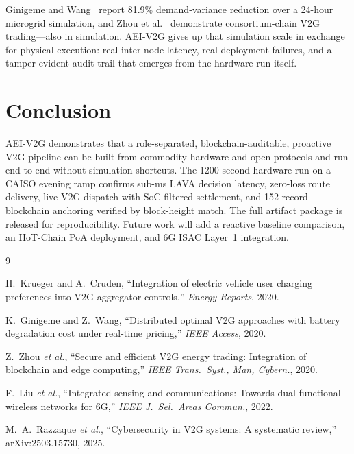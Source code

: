 \documentclass[journal,twoside,twocolumn]{IEEEtran}
\begin{document}
Ginigeme and Wang~\cite{ginigeme2020distributed} report 81.9\% demand-variance
reduction over a 24-hour microgrid simulation, and Zhou et al.~\cite{zhou2020v2g}
demonstrate consortium-chain V2G trading---also in simulation. AEI-V2G gives up
that simulation scale in exchange for physical execution: real inter-node
latency, real deployment failures, and a tamper-evident audit trail that emerges
from the hardware run itself.

\section{Conclusion}
\label{sec:conclude}

AEI-V2G demonstrates that a role-separated, blockchain-auditable, proactive V2G
pipeline can be built from commodity hardware and open protocols and run
end-to-end without simulation shortcuts. The 1200-second hardware run on a CAISO
evening ramp confirms sub-ms LAVA decision latency, zero-loss route delivery,
live V2G dispatch with SoC-filtered settlement, and 152-record blockchain
anchoring verified by block-height match. The full artifact package is released
for reproducibility. Future work will add a reactive baseline comparison, an
IIoT-Chain PoA deployment, and 6G ISAC Layer~1 integration.

\begin{thebibliography}{9}

H.~Krueger and A.~Cruden,
``Integration of electric vehicle user charging preferences into V2G aggregator controls,''
\textit{Energy Reports}, 2020.

K.~Ginigeme and Z.~Wang,
``Distributed optimal V2G approaches with battery degradation cost under real-time pricing,''
\textit{IEEE Access}, 2020.

Z.~Zhou \textit{et al.},
``Secure and efficient V2G energy trading: Integration of blockchain and edge computing,''
\textit{IEEE Trans.\ Syst., Man, Cybern.}, 2020.

F.~Liu \textit{et al.},
``Integrated sensing and communications: Towards dual-functional wireless networks for 6G,''
\textit{IEEE J.\ Sel.\ Areas Commun.}, 2022.

M.~A.~Razzaque \textit{et al.},
``Cybersecurity in V2G systems: A systematic review,''
arXiv:2503.15730, 2025.

\end{thebibliography}
\end{document}
